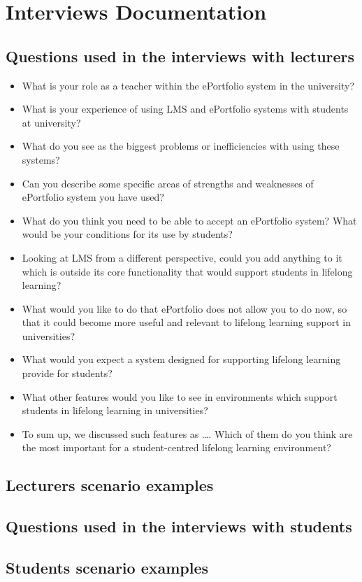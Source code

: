 \chapter{Interviews Documentation \label{cha:interviews}}

\section{Questions used in the interviews with lecturers}
\label{sec:appquestL}
\begin{itemize}
\item What is your role as a teacher within the ePortfolio system in the
university?

\item What is your experience of using LMS and ePortfolio systems with students
at university?

\item What do you see as the biggest problems or inefficiencies with using these
systems?

\item Can you describe some specific areas of strengths and weaknesses of
ePortfolio system you have used?

\item What do you think you need to be able to accept an ePortfolio system? What
would be your conditions for its use by students?

\item Looking at LMS from a different perspective, could you add anything to it
which is outside its core functionality that would support students in lifelong
learning?

\item What would you like to do that ePortfolio does not allow you to do now, so
that it could become more useful and relevant to lifelong learning support in
universities?

\item What would you expect a system designed for supporting lifelong learning
provide for students?

\item What other features would you like to see in environments which support
students in lifelong learning in universities?

\item To sum up, we discussed such features as \ldots. Which of them do you
think are the most important for a student-centred lifelong learning environment?
\end{itemize}

\section{Lecturers scenario examples}
\label{sec:appscenarioL}


\section{Questions used in the interviews with students}
\label{sec:appquestS}

\section{Students scenario examples}
\label{sec:appscenarioS}